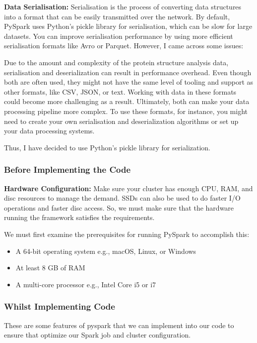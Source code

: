 \documentclass[]{final_report}
\begin{document}
\textbf{Data Serialisation:} Serialisation is the process of converting data structures into a format that can be easily transmitted over the network. By default, PySpark uses Python's pickle library for serialisation, which can be slow for large datasets. You can improve serialisation performance by using more efficient serialisation formats like Avro or Parquet. However, I came across some issues:

Due to the amount and complexity of the protein structure analysis data, serialisation and deserialization can result in performance overhead. Even though both are often used, they might not have the same level of tooling and support as other formats, like CSV, JSON, or text. Working with data in these formats could become more challenging as a result. Ultimately, both can make your data processing pipeline more complex. To use these formats, for instance, you might need to create your own serialisation and deserialization algorithms or set up your data processing systems.

Thus, I have decided to use Python's pickle library for serialization.

\clearpage

\subsubsection{Before Implementing the Code}
\textbf{Hardware Configuration:} Make sure your cluster has enough CPU, RAM, and disc resources to manage the demand. SSDs can also be used to do faster I/O operations and faster disc access. So, we must make sure that the hardware running the framework satisfies the requirements.

We must first examine the prerequisites for running PySpark to accomplish this:

\begin{itemize}
    \item A 64-bit operating system e.g., macOS, Linux, or Windows
    \item At least 8 GB of RAM
    \item A multi-core processor e.g., Intel Core i5 or i7
\end{itemize}

\subsubsection{Whilst Implementing Code}
These are some features of pyspark that we can implement into our code to ensure that optimize our Spark job and cluster configuration.
\end{document}

